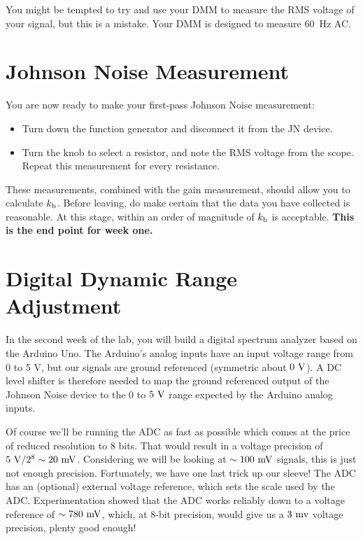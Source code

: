 \documentclass[12pt]{article}
\newcommand{\kb}{k_{\rm b}}
\begin{document}
You might be tempted to try and use your DMM to measure the RMS voltage of your signal, but this is a mistake.  Your DMM is designed to measure 60~\rm Hz AC.

\section{Johnson Noise Measurement}
You are now ready to make your first-pass Johnson Noise measurement:
\begin{itemize}
\item Turn down the function generator and disconnect it from the JN device.

\item Turn the knob to select a resistor, and note the RMS voltage from the scope.  Repeat this measurement for every resistance.  
\end{itemize}

These measurements, combined with the gain measurement, should allow you to calculate $\kb$.
Before leaving, do make certain that the data you have collected is reasonable.  At this stage, within an order of magnitude of $\kb$ is acceptable.  {\bf This is the end point for week one.}  

\section{Digital Dynamic Range Adjustment}

In the second week of the lab, you will build a digital spectrum analyzer based on the Arduino Uno.
The Arduino's analog inputs have an input voltage range from 0 to 5 V, but our signals are ground referenced (symmetric about $0~\rm V$).  A DC level shifter is therefore needed to map the ground referenced output of the Johnson Noise device to the $0$ to $5~\rm V$ range expected by the Arduino analog inputs.  

Of course we'll be running the ADC as fast as possible which comes at the price of reduced resolution to 8 bits.  That would result in a voltage precision of $5~\rm V/ 2^8 \sim 20~\rm mV$.  Considering we will be looking at $\sim 100~\rm mV$ signals, this is just not enough precision.  Fortunately, we have one last trick up our sleeve!  The ADC has an (optional) external voltage reference, which sets the scale used by the ADC.  Experimentation showed that the ADC works reliably down to a voltage reference of $\sim 780~\rm mV$, which, at 8-bit precision, would give us a $3~\rm mv$ voltage precision, plenty good enough!
\end{document}
